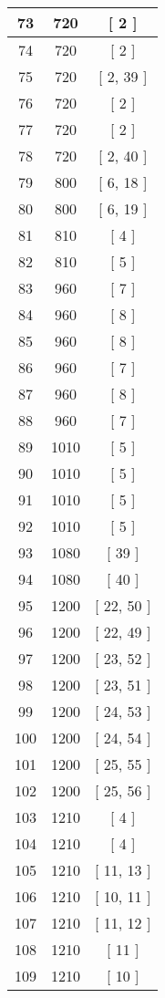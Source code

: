 \begin{center}
\begin{longtable}[H]{|| c c c ||}
73 & 720 & [ 2 ] \\ 
\hline
74 & 720 & [ 2 ] \\ 
\hline
75 & 720 & [ 2, 39 ] \\ 
\hline
76 & 720 & [ 2 ] \\ 
\hline
77 & 720 & [ 2 ] \\ 
\hline
78 & 720 & [ 2, 40 ] \\ 
\hline
79 & 800 & [ 6, 18 ] \\ 
\hline
80 & 800 & [ 6, 19 ] \\ 
\hline
81 & 810 & [ 4 ] \\ 
\hline
82 & 810 & [ 5 ] \\ 
\hline
83 & 960 & [ 7 ] \\ 
\hline
84 & 960 & [ 8 ] \\ 
\hline
85 & 960 & [ 8 ] \\ 
\hline
86 & 960 & [ 7 ] \\ 
\hline
87 & 960 & [ 8 ] \\ 
\hline
88 & 960 & [ 7 ] \\ 
\hline
89 & 1010 & [ 5 ] \\ 
\hline
90 & 1010 & [ 5 ] \\ 
\hline
91 & 1010 & [ 5 ] \\ 
\hline
92 & 1010 & [ 5 ] \\ 
\hline
93 & 1080 & [ 39 ] \\ 
\hline
94 & 1080 & [ 40 ] \\ 
\hline
95 & 1200 & [ 22, 50 ] \\ 
\hline
96 & 1200 & [ 22, 49 ] \\ 
\hline
97 & 1200 & [ 23, 52 ] \\ 
\hline
98 & 1200 & [ 23, 51 ] \\ 
\hline
99 & 1200 & [ 24, 53 ] \\ 
\hline
100 & 1200 & [ 24, 54 ] \\ 
\hline
101 & 1200 & [ 25, 55 ] \\ 
\hline
102 & 1200 & [ 25, 56 ] \\ 
\hline
103 & 1210 & [ 4 ] \\ 
\hline
104 & 1210 & [ 4 ] \\ 
\hline
105 & 1210 & [ 11, 13 ] \\ 
\hline
106 & 1210 & [ 10, 11 ] \\ 
\hline
107 & 1210 & [ 11, 12 ] \\ 
\hline
108 & 1210 & [ 11 ] \\ 
\hline
109 & 1210 & [ 10 ] \\ 

\end{longtable}
\end{center}
